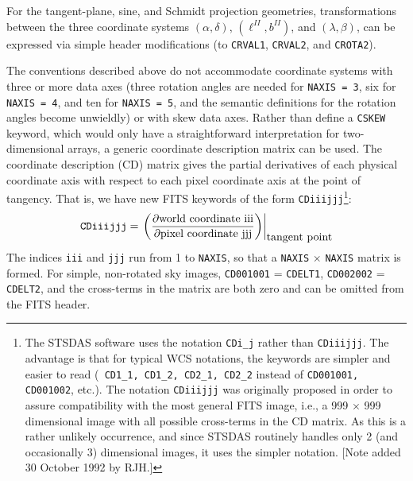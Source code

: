 For the tangent-plane, sine, and Schmidt projection geometries, transformations
between the three coordinate systems $(\alpha,\delta)$, $(\ell^{II},b^{II})$,
and $(\lambda,\beta)$, can be expressed via simple header modifications (to
{\tt CRVAL1}, {\tt CRVAL2}, and {\tt CROTA2}). 

The conventions described above do not accommodate coordinate systems with
three or more data axes (three rotation angles are needed for {\tt NAXIS = 3},
six for {\tt NAXIS = 4}, and ten for {\tt NAXIS = 5}, and the semantic
definitions for the rotation angles become unwieldly) or with skew data axes.
Rather than define a {\tt CSKEW} keyword, which would only have a
straightforward interpretation for two-dimensional arrays, a generic coordinate
description matrix can be used. The coordinate description (CD) matrix gives
the partial derivatives of each physical coordinate axis with respect to each
pixel coordinate axis at the point of tangency.  That is, we have new FITS
keywords of the form {\tt CDiiijjj}\footnote{The STSDAS software uses the
notation {\tt CDi\_j} rather than {\tt CDiiijjj}.  The advantage is that for
typical WCS notations, the keywords are simpler and easier to read ({\tt 
CD1\_1, CD1\_2, CD2\_1, CD2\_2} instead of {\tt CD001001, CD001002}, etc.).  
The notation {\tt CDiiijjj} was originally proposed in order to assure 
compatibility with
the most general FITS image, i.e., a 999 $\times$ 999 dimensional image
with all possible cross-terms in the CD matrix.  As this is a rather
unlikely occurrence, and since STSDAS routinely handles only 2 (and 
occasionally 3) dimensional images, it uses the simpler notation.
[Note added 30 October 1992 by RJH.]}: 
\begin{displaymath}
\hbox{\tt CDiiijjj} = \left. \left( \frac{\partial \hbox{world coordinate 
iii}} {\partial \hbox{pixel coordinate jjj}} \right)
\right|_{\hbox{tangent point}}
\end{displaymath}
The indices {\tt iii} and {\tt jjj} run from 1 to {\tt NAXIS}, so that
a {\tt NAXIS} $\times$ {\tt NAXIS} matrix is formed.
For simple, non-rotated sky images, {\tt CD001001} = {\tt CDELT1}, 
{\tt CD002002} = {\tt CDELT2}, and the cross-terms in the matrix are both zero
and can be omitted from the FITS header. 

